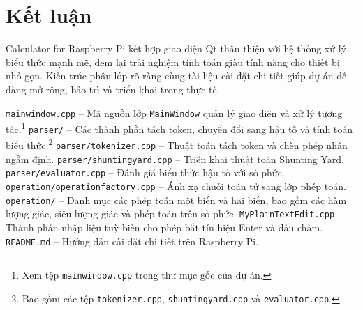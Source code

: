 \documentclass[12pt,a4paper]{article}
\begin{document}
\section{Kết luận}
Calculator for Raspberry Pi kết hợp giao diện Qt thân thiện với hệ thống xử lý biểu thức mạnh mẽ, đem lại trải nghiệm tính toán giàu tính năng cho thiết bị nhỏ gọn. Kiến trúc phân lớp rõ ràng cùng tài liệu cài đặt chi tiết giúp dự án dễ dàng mở rộng, bảo trì và triển khai trong thực tế.

\begin{thebibliography}{9}
\texttt{mainwindow.cpp} -- Mã nguồn lớp \texttt{MainWindow} quản lý giao diện và xử lý tương tác.\footnote{Xem tệp \texttt{mainwindow.cpp} trong thư mục gốc của dự án.}
\texttt{parser/} -- Các thành phần tách token, chuyển đổi sang hậu tố và tính toán biểu thức.\footnote{Bao gồm các tệp \texttt{tokenizer.cpp}, \texttt{shuntingyard.cpp} và \texttt{evaluator.cpp}.}
\texttt{parser/tokenizer.cpp} -- Thuật toán tách token và chèn phép nhân ngầm định.
\texttt{parser/shuntingyard.cpp} -- Triển khai thuật toán Shunting Yard.
\texttt{parser/evaluator.cpp} -- Đánh giá biểu thức hậu tố với số phức.
\texttt{operation/operationfactory.cpp} -- Ánh xạ chuỗi toán tử sang lớp phép toán.
\texttt{operation/} -- Danh mục các phép toán một biến và hai biến, bao gồm các hàm lượng giác, siêu lượng giác và phép toán trên số phức.
\texttt{MyPlainTextEdit.cpp} -- Thành phần nhập liệu tuỳ biến cho phép bắt tín hiệu Enter và dấu chấm.
\texttt{README.md} -- Hướng dẫn cài đặt chi tiết trên Raspberry Pi.
\end{thebibliography}
\end{document}

